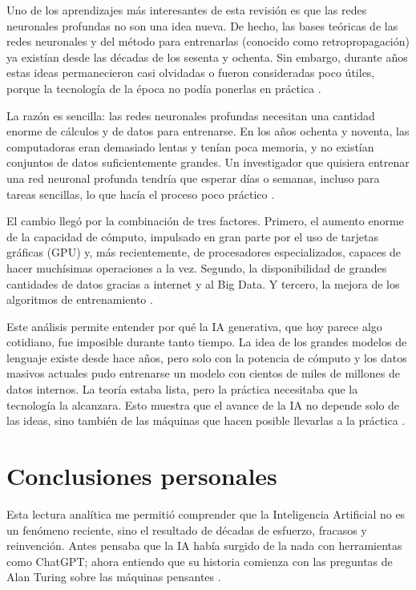 \documentclass[11pt]{article}
\begin{document}
Uno de los aprendizajes más interesantes de esta revisión es que las redes neuronales profundas no son una idea nueva. De hecho, las bases teóricas de las redes neuronales y del método para entrenarlas (conocido como retropropagación) ya existían desde las décadas de los sesenta y ochenta. Sin embargo, durante años estas ideas permanecieron casi olvidadas o fueron consideradas poco útiles, porque la tecnología de la época no podía ponerlas en práctica \parencite{zhang_turing_2023}.

La razón es sencilla: las redes neuronales profundas necesitan una cantidad enorme de cálculos y de datos para entrenarse. En los años ochenta y noventa, las computadoras eran demasiado lentas y tenían poca memoria, y no existían conjuntos de datos suficientemente grandes. Un investigador que quisiera entrenar una red neuronal profunda tendría que esperar días o semanas, incluso para tareas sencillas, lo que hacía el proceso poco práctico \parencite{haenlein_brief_2019}.

El cambio llegó por la combinación de tres factores. Primero, el aumento enorme de la capacidad de cómputo, impulsado en gran parte por el uso de tarjetas gráficas (GPU) y, más recientemente, de procesadores especializados, capaces de hacer muchísimas operaciones a la vez. Segundo, la disponibilidad de grandes cantidades de datos gracias a internet y al Big Data. Y tercero, la mejora de los algoritmos de entrenamiento \parencite{zhang_turing_2023}.

Este análisis permite entender por qué la IA generativa, que hoy parece algo cotidiano, fue imposible durante tanto tiempo. La idea de los grandes modelos de lenguaje existe desde hace años, pero solo con la potencia de cómputo y los datos masivos actuales pudo entrenarse un modelo con cientos de miles de millones de datos internos. La teoría estaba lista, pero la práctica necesitaba que la tecnología la alcanzara. Esto muestra que el avance de la IA no depende solo de las ideas, sino también de las máquinas que hacen posible llevarlas a la práctica \parencite{zhang_turing_2023}.

\section{Conclusiones personales}

Esta lectura analítica me permitió comprender que la Inteligencia Artificial no es un fenómeno reciente, sino el resultado de décadas de esfuerzo, fracasos y reinvención. Antes pensaba que la IA había surgido de la nada con herramientas como ChatGPT; ahora entiendo que su historia comienza con las preguntas de Alan Turing sobre las máquinas pensantes \parencite{grosz_what_2012}.    
\end{document}
